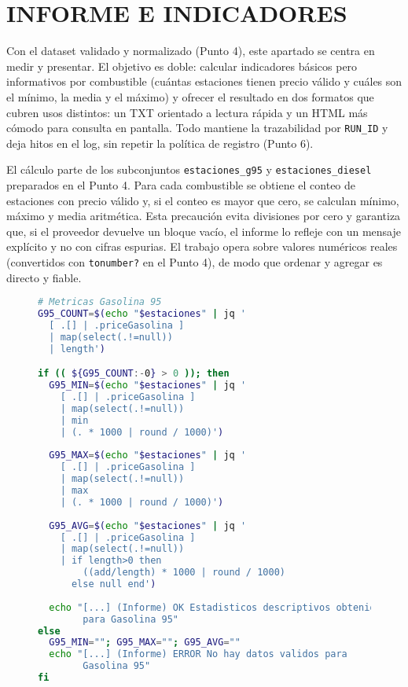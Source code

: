 \chapter{INFORME E INDICADORES}

Con el dataset validado y normalizado (Punto 4), este apartado se centra en medir y presentar. El objetivo es doble: calcular indicadores básicos pero informativos por combustible (cuántas estaciones tienen precio válido y cuáles son el mínimo, la media y el máximo) y ofrecer el resultado en dos formatos que cubren usos distintos: un TXT orientado a lectura rápida y un HTML más cómodo para consulta en pantalla. Todo mantiene la trazabilidad por \texttt{RUN\_ID} y deja hitos en el log, sin repetir la política de registro (Punto 6).

El cálculo parte de los subconjuntos \texttt{estaciones\_g95} y \texttt{estaciones\_diesel} preparados en el Punto 4. Para cada combustible se obtiene el conteo de estaciones con precio válido y, si el conteo es mayor que cero, se calculan mínimo, máximo y media aritmética. Esta precaución evita divisiones por cero y garantiza que, si el proveedor devuelve un bloque vacío, el informe lo refleje con un mensaje explícito y no con cifras espurias. El trabajo opera sobre valores numéricos reales (convertidos con \texttt{tonumber?} en el Punto 4), de modo que ordenar y agregar es directo y fiable.

\begin{figure}[H]
  \begin{lstlisting}[language=bash, caption={Figura 5.1 — Cálculo de métricas por combustible}]
# Metricas Gasolina 95
G95_COUNT=$(echo "$estaciones" | jq '
  [ .[] | .priceGasolina ] 
  | map(select(.!=null)) 
  | length')

if (( ${G95_COUNT:-0} > 0 )); then
  G95_MIN=$(echo "$estaciones" | jq '
    [ .[] | .priceGasolina ] 
    | map(select(.!=null)) 
    | min 
    | (. * 1000 | round / 1000)')
  
  G95_MAX=$(echo "$estaciones" | jq '
    [ .[] | .priceGasolina ] 
    | map(select(.!=null)) 
    | max 
    | (. * 1000 | round / 1000)')
  
  G95_AVG=$(echo "$estaciones" | jq '
    [ .[] | .priceGasolina ] 
    | map(select(.!=null)) 
    | if length>0 then 
        ((add/length) * 1000 | round / 1000) 
      else null end')
  
  echo "[...] (Informe) OK Estadisticos descriptivos obtenidos 
        para Gasolina 95"
else
  G95_MIN=""; G95_MAX=""; G95_AVG=""
  echo "[...] (Informe) ERROR No hay datos validos para 
        Gasolina 95"
fi
\end{lstlisting}
\end{figure}

